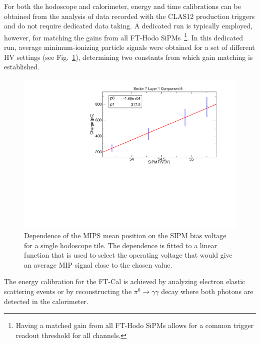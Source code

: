 For both the hodoscope and calorimeter, energy and time calibrations can be obtained from the analysis of data
recorded with the CLAS12 production triggers and do not require dedicated data taking. A dedicated run is
typically employed, however, for matching the gains from all FT-Hodo SiPMs~\footnote{Having a matched gain
from all FT-Hodo SiPMs allows for a common trigger readout threshold for all channels.}. In this dedicated run,
average minimum-ionizing particle signals were obtained for a set of different HV settings (see
Fig.~\ref{fig:fthodo_gainmatch}), determining two constants from which gain matching is established.

\begin{figure}
\includegraphics[width=1.0\columnwidth]{fig/fthodo_gainmatch.pdf}
\caption{Dependence of the MIPS mean position on the SIPM bias voltage for a single hodoscope tile. The dependence is fitted to a linear function that is used to select the operating voltage that would give an average MIP signal close to the chosen value.}
\label{fig:fthodo_gainmatch}
\end{figure}

The energy calibration for the FT-Cal is achieved by analyzing electron elastic scattering events or by reconstructing
the $\pi^0\to\gamma\gamma$ decay where both photons are detected in the calorimeter. 

